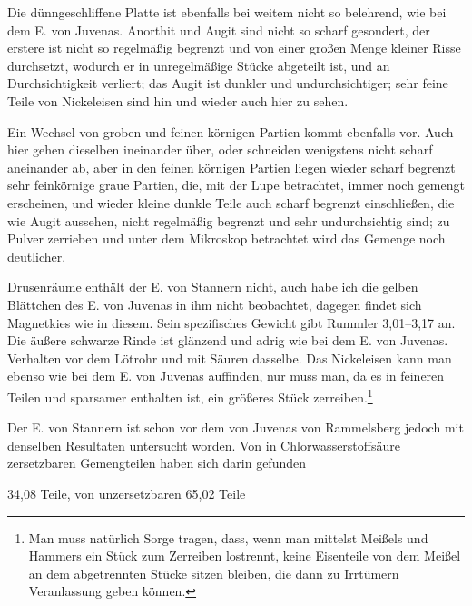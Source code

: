 \documentclass[a4paper, 11pt, oneside]{article}
\begin{document}
Die dünngeschliffene Platte ist ebenfalls bei weitem nicht so belehrend, wie bei dem E. von Juvenas. Anorthit und Augit sind nicht so scharf gesondert, der erstere ist nicht so regelmäßig begrenzt und von einer großen Menge kleiner Risse durchsetzt, wodurch er in unregelmäßige Stücke abgeteilt ist, und an Durchsichtigkeit verliert; das Augit ist dunkler und undurchsichtiger; sehr feine Teile von Nickeleisen sind hin und wieder auch hier zu sehen.

Ein Wechsel von groben und feinen körnigen Partien kommt ebenfalls vor. Auch hier gehen dieselben ineinander über, oder schneiden wenigstens nicht scharf aneinander ab, aber in den feinen körnigen Partien liegen wieder scharf begrenzt sehr feinkörnige graue Partien, die, mit der Lupe betrachtet, immer noch gemengt erscheinen, und wieder kleine dunkle Teile auch scharf begrenzt einschließen, die wie Augit aussehen, nicht regelmäßig begrenzt und sehr undurchsichtig sind; zu Pulver zerrieben und unter dem Mikroskop betrachtet wird das Gemenge noch deutlicher.

Drusenräume enthält der E. von Stannern nicht, auch habe ich die gelben Blättchen des E. von Juvenas in ihm nicht beobachtet, dagegen findet sich Magnetkies wie in diesem. Sein spezifisches Gewicht gibt Rummler 3,01--3,17 an. Die äußere schwarze Rinde ist glänzend und adrig wie bei dem E. von Juvenas. Verhalten vor dem Lötrohr und mit Säuren dasselbe. Das Nickeleisen kann man ebenso wie bei dem E. von Juvenas auffinden, nur muss man, da es in feineren Teilen und sparsamer enthalten ist, ein größeres Stück zerreiben.\footnote{Man muss natürlich Sorge tragen, dass, wenn man mittelst Meißels und Hammers ein Stück zum Zerreiben lostrennt, keine Eisenteile von dem Meißel an dem abgetrennten Stücke sitzen bleiben, die dann zu Irrtümern Veranlassung geben können.}

Der E. von Stannern ist schon vor dem von Juvenas von Rammelsberg jedoch mit denselben Resultaten untersucht worden. Von in Chlorwasserstoffsäure zersetzbaren Gemengteilen haben sich darin gefunden

34,08 Teile,  
von unzersetzbaren 65,02 Teile  
\end{document}
